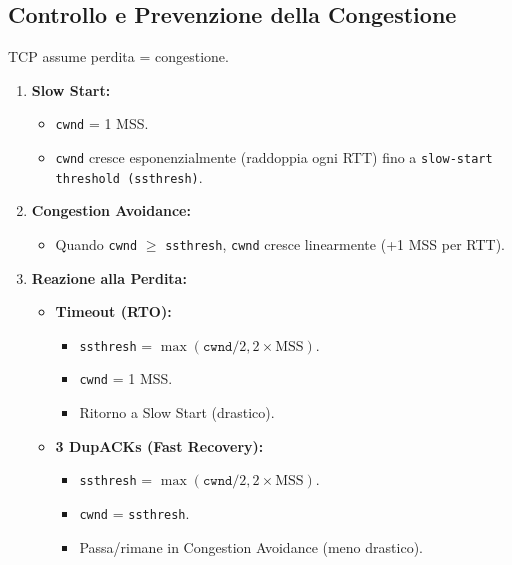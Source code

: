 \documentclass{article}
\begin{document}
\subsection{Controllo e Prevenzione della Congestione}
TCP assume perdita = congestione.
\begin{enumerate}
    \item \textbf{Slow Start:}
    \begin{itemize}
        \item \texttt{cwnd} = 1 MSS.
        \item \texttt{cwnd} cresce esponenzialmente (raddoppia ogni RTT) fino a \texttt{slow-start threshold (ssthresh)}.
    \end{itemize}
    \item \textbf{Congestion Avoidance:}
    \begin{itemize}
        \item Quando \texttt{cwnd} $\ge$ \texttt{ssthresh}, \texttt{cwnd} cresce linearmente (+1 MSS per RTT).
    \end{itemize}
    \item \textbf{Reazione alla Perdita:}
    \begin{itemize}
        \item \textbf{Timeout (RTO):}
        \begin{itemize}
            \item \texttt{ssthresh} = $\max(\texttt{cwnd}/2, 2 \times \text{MSS})$.
            \item \texttt{cwnd} = 1 MSS.
            \item Ritorno a Slow Start (drastico).
        \end{itemize}
        \item \textbf{3 DupACKs (Fast Recovery):}
        \begin{itemize}
            \item \texttt{ssthresh} = $\max(\texttt{cwnd}/2, 2 \times \text{MSS})$.
            \item \texttt{cwnd} = \texttt{ssthresh}.
            \item Passa/rimane in Congestion Avoidance (meno drastico).
        \end{itemize}
    \end{itemize}
\end{enumerate}
\end{document}
